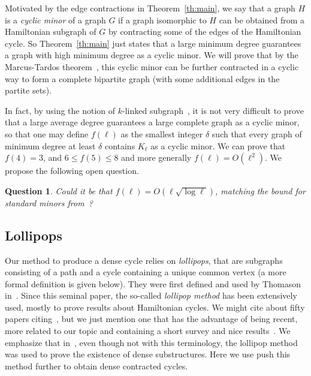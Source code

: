 \documentclass[11pt]{article}
\newtheorem{ques}[theo]{Question}
\begin{document}
 Motivated by the edge contractions in Theorem~\ref{th:main}, we say that a graph $H$ is a \emph{cyclic minor} of a graph $G$ if a graph isomorphic to $H$ can be obtained from a Hamiltonian subgraph of $G$ by contracting some of the edges of the Hamiltonian cycle. So Theorem~\ref{th:main} just states that a large minimum degree guarantees a graph with high minimum degree as a cyclic minor. We will prove that by the Marcus-Tardos theorem~\cite{MARCUS2004153}, this cyclic minor can be further contracted in a cyclic way to form a complete bipartite graph (with some additional edges in the partite sets). 
 
 In fact, by using the notion of $k$-linked subgraph~\cite{THOMAS2005309}, it is not very difficult to prove that a large average degree guarantees a large complete graph as a cyclic minor, so that one may define  $f(\ell)$ as the smallest integer $\delta$ such that every graph of minimum degree at least $\delta$ contains $K_\ell$ as a cyclic minor.   We can prove that $f(4)=3$,  and $6 \le f(5)\le 8$ and more generally $f(\ell)=O(\ell^2)$.  We propose the following open question.

\begin{ques}Could it be that $f(\ell)=O(\ell\sqrt{\log \ell})$, matching the bound for standard minors from~\cite{kos1982,DBLP:journals/dm/Vega83}?
\end{ques}


 
 \subsection*{Lollipops}
 
 
    Our method to produce a dense cycle relies on \emph{lollipops}, that are subgraphs consisting of a path and a cycle containing a unique common vertex (a more formal definition is given below).  They were first defined and used by Thomason in~\cite{MR499124}. Since this seminal paper, the so-called \emph{lollipop method} has been extensively used, mostly to prove results about Hamiltonian cycles. We might cite about fifty papers citing~\cite{MR499124}, but we just mention one that has the advantage of being recent, more related to our topic and containing a short survey and nice results~\cite{DBLP:journals/jct/Thomassen18a}. We emphasize that in~\cite{GUPTA198037}, even though not with this terminology, the lollipop method was used to prove the existence of dense substructures. Here we use push this method further to obtain dense contracted cycles.
    
\end{document}
